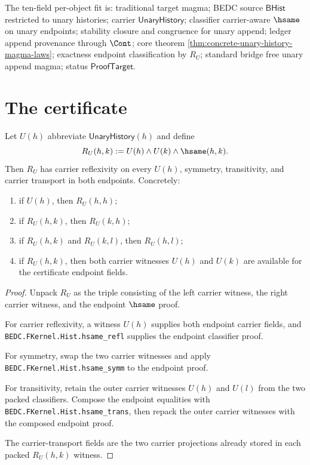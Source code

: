 The ten-field per-object fit is: traditional target magma; BEDC source
$\mathsf{BHist}$ restricted to unary histories; carrier $\mathsf{UnaryHistory}$;
classifier carrier-aware $\hsame$ on unary endpoints; stability closure and
congruence for unary append; ledger append provenance through $\Cont$; core
theorem \autoref{thm:concrete-unary-history-magma-laws}; exactness endpoint
classification by $R_U$; standard bridge free unary append magma; status
$\mathsf{ProofTarget}$.

\section{The certificate}
\label{sec:magma-certificate}

\begin{lemma}
\label{lem:concrete-unary-history-magma-classifier-stability}
Let $U(h)$ abbreviate $\mathsf{UnaryHistory}(h)$ and define
$$
R_U(h,k):=U(h)\land U(k)\land\hsame(h,k).
$$
Then $R_U$ has carrier reflexivity on every $U(h)$, symmetry,
transitivity, and carrier transport in both endpoints. Concretely:
\begin{enumerate}
\item if $U(h)$, then $R_U(h,h)$;
\item if $R_U(h,k)$, then $R_U(k,h)$;
\item if $R_U(h,k)$ and $R_U(k,l)$, then $R_U(h,l)$;
\item if $R_U(h,k)$, then both carrier witnesses $U(h)$ and $U(k)$ are
available for the certificate endpoint fields.
\end{enumerate}
\end{lemma}
\begin{proof}
Unpack $R_U$ as the triple consisting of the left carrier witness, the right
carrier witness, and the endpoint $\hsame$ proof.

For carrier reflexivity, a witness $U(h)$ supplies both endpoint carrier
fields, and \texttt{BEDC.FKernel.Hist.hsame\_refl} supplies the endpoint
classifier proof.

For symmetry, swap the two carrier witnesses and apply
\texttt{BEDC.FKernel.Hist.hsame\_symm} to the endpoint proof.

For transitivity, retain the outer carrier witnesses $U(h)$ and $U(l)$ from
the two packed classifiers. Compose the endpoint equalities with
\texttt{BEDC.FKernel.Hist.hsame\_trans}, then repack the outer carrier
witnesses with the composed endpoint proof.

The carrier-transport fields are the two carrier projections already stored in
each packed $R_U(h,k)$ witness.
\end{proof}

